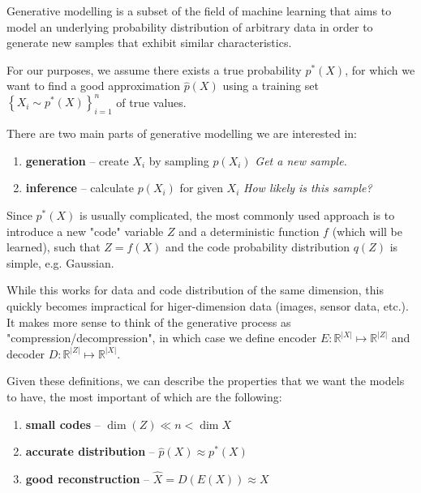 \label{sec:background}

Generative modelling is a subset of the field of machine learning that aims to model an underlying probability distribution of arbitrary data in order to generate new samples that exhibit similar characteristics.


For our purposes, we assume there exists a true probability $p^*(X)$, for which we want to find a good approximation $\hat{p}(X)$ using a training set $\left\{X_i \sim p^*(X)\right\}_{i=1}^n$ of true values.

There are two main parts of generative modelling we are interested in:

\begin{enumerate}
    \item \textbf{generation} -- create $X_i$ by sampling $p(X_i)$ \hfill \textit{Get a new sample.}
    \item \textbf{inference} -- calculate $p(X_i)$ for given $X_i$ \hfill \textit{How likely is this sample?}
\end{enumerate}

Since $p^*(X)$ is usually complicated, the most commonly used approach is to introduce a new "code" variable $Z$ and a deterministic function $f$ (which will be learned), such that $Z = f(X)$ and the code probability distribution $q(Z)$ is simple, e.g. Gaussian.

While this works for data and code distribution of the same dimension, this quickly becomes impractical for higer-dimension data (images, sensor data, etc.).
It makes more sense to think of the generative process as "compression/decompression", in which case we define encoder $E: \mathbb{R}^{|X|} \mapsto \mathbb{R}^{|Z|}$ and decoder $D: \mathbb{R}^{|Z|} \mapsto \mathbb{R}^{|X|}$.

Given these definitions, we can describe the properties that we want the models to have, the most important of which are the following:

\begin{enumerate}
    \item \textbf{small codes} -- $\dim(Z) \ll n < \dim{X}$
    \item \textbf{accurate distribution} -- $\hat{p}(X) \approx p^*(X)$
    \item \textbf{good reconstruction} -- $\hat{X} = D(E(X)) \approx X$
\end{enumerate}

